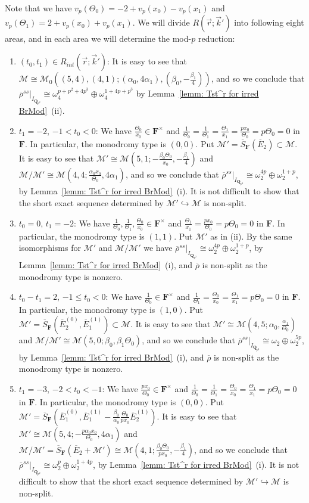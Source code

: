 \documentclass[11pt]{amsart}
\theoremstyle{definition}
\numberwithin{equation}{subsection}
\theoremstyle{plain}
\theoremstyle{plain}
\theoremstyle{plain}
\theoremstyle{plain}
\theoremstyle{plain}
\theoremstyle{plain}
\theoremstyle{plain}
\theoremstyle{plain}
\theoremstyle{plain}
\theoremstyle{plain}
\theoremstyle{plain}
\theoremstyle{plain}
\theoremstyle{definition}
\theoremstyle{definition}
\theoremstyle{definition}
\theoremstyle{remark}
\renewcommand{\(}{\textup{(}}
\renewcommand{\)}{\textup{)}}
\newcommand{\Q}{\mathbf{Q}}
\newcommand{\F}{\mathbf{F}}
\newcommand{\barS}{\overline{S}}
\newcommand{\rhobar}{\overline{\rho}}
\newcommand{\cM}{\mathcal{M}}
\newcommand{\barE}{\overline{E}}
\newcommand{\vr}{\vec{r}}
\newcommand{\vk}{\vec{k}}
\newcommand{\IQptwo}{{I_{\Q_{p^2}}}}
\begin{document}
Note that we have $v_p(\Theta_0)=-2+v_p(x_0)-v_p(x_1)$ and $v_p(\Theta_1)=2+v_p(x_0)+v_p(x_1)$. We will divide $R(\vr;\vk')$ into following eight areas, and in each area we will determine the mod-$p$ reduction:
\begin{enumerate}[leftmargin=*]
  \item $(t_0,t_1)\in R_{int}(\vr;\vk')$: It is easy to see that $\cM\cong\cM_0((5,4),(4,1);(\alpha_0,4\alpha_1),(\beta_0,-\frac{\beta_1}{4}))$, and so we conclude that $\rhobar^{ss}|_\IQptwo\cong\omega_4^{p+p^2+4p^3}\oplus\omega_4^{1+4p+p^3}$ by Lemma~\ref{lemm: Tst^r for irred BrMod}~(ii).
  \item $t_1=-2$, $-1<t_0<0$: We have $\frac{\Theta_0}{x_0}\in\F^\times$ and $\frac{1}{\Theta_0}=\frac{1}{\Theta_1}=\frac{\Theta_1}{x_1}=\frac{px_0}{\Theta_0}=p\Theta_0=0$ in $\F$. In particular, the monodromy type is $(0,0)$. Put $\cM'=\barS_{\F}(\barE_2)\subset\cM$. It is easy to see that $\cM'\cong\cM(5,1;-\frac{\beta_0\Theta_0}{x_0},-\frac{\beta_1}{4})$ and $\cM/\cM'\cong\cM(4,4;\frac{\alpha_0x_0}{\Theta_0},4\alpha_1)$, and so we conclude that $\rhobar^{ss}|_\IQptwo\cong \omega_2^{4p}\oplus\omega_2^{1+p}$, by Lemma~\ref{lemm: Tst^r for irred BrMod}~(i). It is not difficult to show that the short exact sequence determined by $\cM'\hookrightarrow \cM$ is non-split.
  \item $t_0=0$, $t_1=-2$: We have $\frac{1}{\Theta_0},\frac{1}{\Theta_1},\frac{\Theta_0}{x_0}\in\F^\times$ and $\frac{\Theta_1}{x_1}=\frac{px_0}{\Theta_0}=p\Theta_0=0$ in $\F$. In particular, the monodromy type is $(1,1)$. Put $\cM'$ as in (ii). By the same isomorphisms for $\cM'$ and $\cM/\cM'$ we have $\rhobar^{ss}|_\IQptwo\cong \omega_2^{4p}\oplus\omega_2^{1+p}$, by Lemma~\ref{lemm: Tst^r for irred BrMod}~(i), and $\rhobar$ is non-split as the monodromy type is nonzero.
  \item $t_0-t_1=2$, $-1\leq t_0<0$: We have $\frac{1}{\Theta_0}\in\F^\times$ and $\frac{1}{\Theta_1}=\frac{\Theta_0}{x_0}=\frac{\Theta_1}{x_1}=p\Theta_0=0$ in $\F$. In particular, the monodromy type is $(1,0)$. Put $\cM'=\barS_{\F}(\barE_2^{(0)},\barE_1^{(1)})\subset\cM$. It is easy to see that $\cM'\cong\cM(4,5;\alpha_0,\frac{\alpha_1}{\Theta_0})$ and $\cM/\cM'\cong\cM(5,0;\beta_0,\beta_1\Theta_0)$, and so we conclude that $\rhobar^{ss}|_\IQptwo\cong\omega_2\oplus\omega_2^{5p}$, by Lemma~\ref{lemm: Tst^r for irred BrMod}~(i), and $\rhobar$ is non-split as the monodromy type is nonzero.
  \item $t_1=-3$, $-2<t_0<-1$: We have $\frac{px_0}{\Theta_0}\in\F^\times$ and $\frac{1}{\Theta_0}=\frac{1}{\Theta_1}=\frac{\Theta_0}{x_0}=\frac{\Theta_1}{x_1}=p\Theta_0=0$ in $\F$. In particular, the monodromy type is $(0,0)$. Put $\cM'=\barS_{\F}(\barE_1^{(0)},\barE_1^{(1)}-\frac{\beta_0}{\alpha_0}\frac{\Theta_0}{px_0}\barE_2^{(1)})$. It is easy to see that $\cM'\cong\cM(5,4;-\frac{p\alpha_0x_0}{\Theta_0},4\alpha_1)$ and $\cM/\cM'=\barS_{\F}(\barE_2+\cM')\cong\cM(4,1;\frac{\beta_0\Theta_0}{px_0},-\frac{\beta_1}{4})$, and so we conclude that $\rhobar^{ss}|_\IQptwo\cong\omega_2^p\oplus\omega_2^{1+4p}$, by Lemma~\ref{lemm: Tst^r for irred BrMod}~(i). It is not difficult to show that the short exact sequence determined by $\cM'\hookrightarrow \cM$ is non-split.

\end{enumerate}
\end{document}
